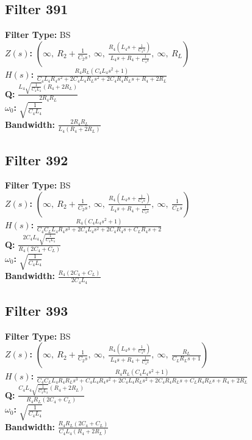 \documentclass{article}
\begin{document}
\subsection*{Filter 391}
\textbf{Filter Type:} BS \\ 
\textbf{$Z(s)$:} $\left( \infty, \  R_{2} + \frac{1}{C_{2} s}, \  \infty, \  \frac{R_{4} \left(L_{4} s + \frac{1}{C_{4} s}\right)}{L_{4} s + R_{4} + \frac{1}{C_{4} s}}, \  \infty, \  R_{L}\right)$ \\ 
\textbf{$H(s)$:} $\frac{R_{4} R_{L} \left(C_{4} L_{4} s^{2} + 1\right)}{C_{4} L_{4} R_{4} s^{2} + 2 C_{4} L_{4} R_{L} s^{2} + 2 C_{4} R_{4} R_{L} s + R_{4} + 2 R_{L}}$ \\ 
\textbf{Q:} $\frac{L_{4} \sqrt{\frac{1}{C_{4} L_{4}}} \left(R_{4} + 2 R_{L}\right)}{2 R_{4} R_{L}}$ \\ 
\textbf{$\omega_0$:} $\sqrt{\frac{1}{C_{4} L_{4}}}$ \\ 
\textbf{Bandwidth:} $\frac{2 R_{4} R_{L}}{L_{4} \left(R_{4} + 2 R_{L}\right)}$ \\ 
\subsection*{Filter 392}
\textbf{Filter Type:} BS \\ 
\textbf{$Z(s)$:} $\left( \infty, \  R_{2} + \frac{1}{C_{2} s}, \  \infty, \  \frac{R_{4} \left(L_{4} s + \frac{1}{C_{4} s}\right)}{L_{4} s + R_{4} + \frac{1}{C_{4} s}}, \  \infty, \  \frac{1}{C_{L} s}\right)$ \\ 
\textbf{$H(s)$:} $\frac{R_{4} \left(C_{4} L_{4} s^{2} + 1\right)}{C_{4} C_{L} L_{4} R_{4} s^{3} + 2 C_{4} L_{4} s^{2} + 2 C_{4} R_{4} s + C_{L} R_{4} s + 2}$ \\ 
\textbf{Q:} $\frac{2 C_{4} L_{4} \sqrt{\frac{1}{C_{4} L_{4}}}}{R_{4} \left(2 C_{4} + C_{L}\right)}$ \\ 
\textbf{$\omega_0$:} $\sqrt{\frac{1}{C_{4} L_{4}}}$ \\ 
\textbf{Bandwidth:} $\frac{R_{4} \left(2 C_{4} + C_{L}\right)}{2 C_{4} L_{4}}$ \\ 
\subsection*{Filter 393}
\textbf{Filter Type:} BS \\ 
\textbf{$Z(s)$:} $\left( \infty, \  R_{2} + \frac{1}{C_{2} s}, \  \infty, \  \frac{R_{4} \left(L_{4} s + \frac{1}{C_{4} s}\right)}{L_{4} s + R_{4} + \frac{1}{C_{4} s}}, \  \infty, \  \frac{R_{L}}{C_{L} R_{L} s + 1}\right)$ \\ 
\textbf{$H(s)$:} $\frac{R_{4} R_{L} \left(C_{4} L_{4} s^{2} + 1\right)}{C_{4} C_{L} L_{4} R_{4} R_{L} s^{3} + C_{4} L_{4} R_{4} s^{2} + 2 C_{4} L_{4} R_{L} s^{2} + 2 C_{4} R_{4} R_{L} s + C_{L} R_{4} R_{L} s + R_{4} + 2 R_{L}}$ \\ 
\textbf{Q:} $\frac{C_{4} L_{4} \sqrt{\frac{1}{C_{4} L_{4}}} \left(R_{4} + 2 R_{L}\right)}{R_{4} R_{L} \left(2 C_{4} + C_{L}\right)}$ \\ 
\textbf{$\omega_0$:} $\sqrt{\frac{1}{C_{4} L_{4}}}$ \\ 
\textbf{Bandwidth:} $\frac{R_{4} R_{L} \left(2 C_{4} + C_{L}\right)}{C_{4} L_{4} \left(R_{4} + 2 R_{L}\right)}$ \\ 
\end{document}
